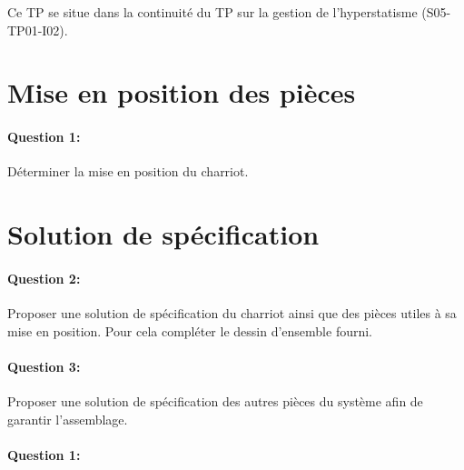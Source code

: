 

\cleardoublepage

Ce TP se situe dans la continuité du TP sur la gestion de l'hyperstatisme (S05-TP01-I02).

\section{Mise en position des pièces}

\paragraph{Question 1:} Déterminer la mise en position du charriot.

\reponse[4]

\section{Solution de spécification}

\paragraph{Question 2:} Proposer une solution de spécification du charriot ainsi que des pièces utiles à sa mise en position. Pour cela compléter le dessin d'ensemble fourni.

\paragraph{Question 3:} Proposer une solution de spécification des autres pièces du système afin de garantir l'assemblage.





\pagestyle{correction}\setcounter{section}{0}

\paragraph{Question 1:}

